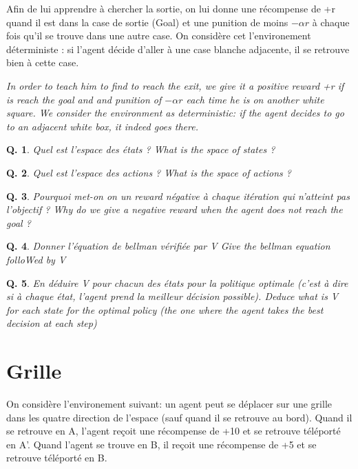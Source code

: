 \documentclass[a4paper]{exam}
\newtheorem{question}{{\bf Q.}}[section]
\begin{document}
Afin de lui apprendre à chercher la sortie, on lui donne une récompense de +r quand il est dans la case de sortie (Goal) et une punition de moins $-\alpha r$ à chaque fois qu'il se trouve dans une autre case. On considère cet l'environement déterministe : si l'agent décide d'aller à une case blanche adjacente, il se retrouve bien à cette case.

\em{In order to teach him to find to reach the exit, we give it a positive reward +r if is reach the goal and and punition of $-\alpha r$ each time he is on another white square. We consider the environment as deterministic: if the agent decides to go to an adjacent white box, it indeed goes there.}

\begin{question}
	Quel est l'espace des états ? \em{What is the space of states ?}
\end{question}

\begin{question}
	Quel est l'espace des actions ? \em{What is the space of actions ?}
\end{question}

\begin{question}
	Pourquoi met-on on un reward négative à chaque itération qui n'atteint pas l'objectif ? \em{Why do we give a negative reward when the agent does not reach the goal ?}
\end{question}


\begin{question}
Donner l'équation de bellman vérifiée par V \em{Give the bellman equation folloWed by V}
\end{question}

\begin{question}
En déduire V pour chacun des états pour la politique optimale (c'est à dire si à chaque état, l'agent prend la meilleur décision possible). \em{Deduce what is V for each state for the optimal policy (the one where the agent takes the best decision at each step)}

\end{question}

\section{Grille}

On considère l'environement suivant: un agent peut se déplacer sur une grille dans les quatre direction de l'espace (sauf quand il se retrouve au bord). Quand il se retrouve en A, l'agent reçoit une récompense de +10 et se retrouve téléporté en A'. Quand l'agent se trouve en B, il reçoit une récompense de +5 et se retrouve téléporté en B.
\end{document}
